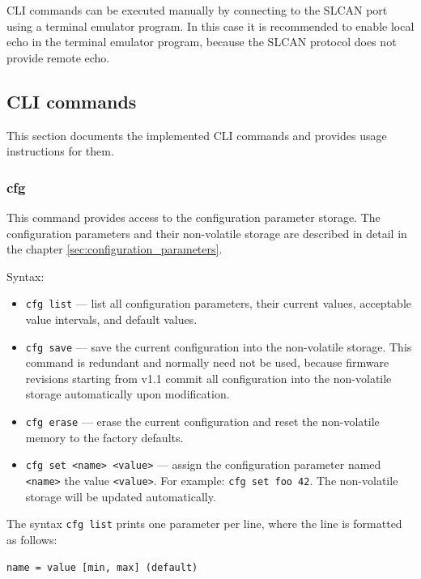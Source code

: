 \documentclass{zubaxdoc}
\begin{document}
CLI commands can be executed manually by connecting to the SLCAN port using a terminal emulator program.
In this case it is recommended to enable local echo in the terminal emulator program,
because the SLCAN protocol does not provide remote echo.

\subsection{CLI commands}

This section documents the implemented CLI commands and provides usage instructions for them.

\subsubsection{cfg}

This command provides access to the configuration parameter storage.
The configuration parameters and their non-volatile storage are described in detail in the chapter
\ref{sec:configuration_parameters}.

Syntax:
\begin{itemize}
    \item \verb|cfg list| --- list all configuration parameters, their current values,
          acceptable value intervals, and default values.

    \item \verb|cfg save| --- save the current configuration into the non-volatile storage.
          This command is redundant and normally need not be used,
          because firmware revisions starting from v1.1 commit all configuration
          into the non-volatile storage automatically upon modification.

    \item \verb|cfg erase| --- erase the current configuration and reset the non-volatile memory to
          the factory defaults.

    \item \verb|cfg set <name> <value>| --- assign the configuration parameter named \verb|<name>| the value
          \verb|<value>|. For example: \verb|cfg set foo 42|.
          The non-volatile storage will be updated automatically.
\end{itemize}

The syntax \verb|cfg list| prints one parameter per line, where the line is formatted as follows:

\verb|name = value [min, max] (default)|
\end{document}
